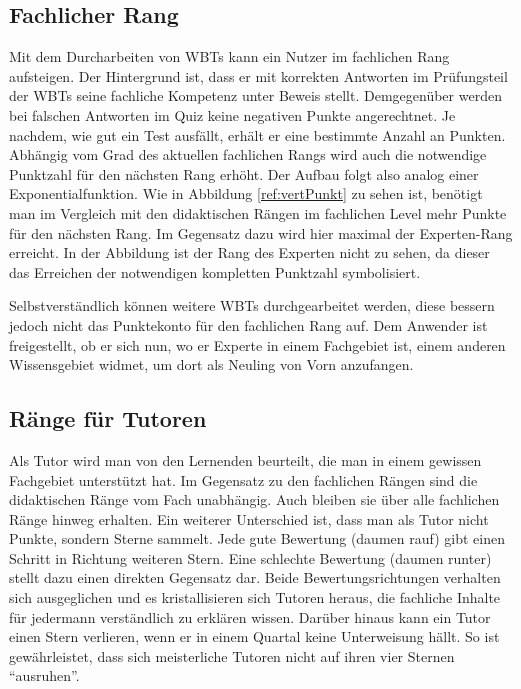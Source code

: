 \subsection{Fachlicher Rang}\label{ref:rankTopic}
Mit dem Durcharbeiten von WBTs kann ein Nutzer im fachlichen Rang aufsteigen.
Der Hintergrund ist, dass er mit korrekten Antworten im Prüfungsteil der WBTs
seine fachliche Kompetenz unter Beweis stellt. Demgegenüber werden bei falschen
Antworten im Quiz keine negativen Punkte angerechtnet. Je nachdem, wie gut ein
Test ausfällt, erhält er eine bestimmte Anzahl an Punkten. Abhängig vom Grad des
aktuellen fachlichen Rangs wird auch die notwendige Punktzahl für den nächsten
Rang erhöht. Der Aufbau folgt also analog einer Exponentialfunktion. Wie in
Abbildung \ref{ref:vertPunkt} zu sehen ist, benötigt man im Vergleich mit den
didaktischen Rängen im fachlichen Level mehr Punkte für den nächsten Rang. Im
Gegensatz dazu wird hier maximal der Experten-Rang erreicht. In der Abbildung
ist der Rang des Experten nicht zu sehen, da dieser das Erreichen der
notwendigen kompletten Punktzahl symbolisiert.

Selbstverständlich können weitere WBTs durchgearbeitet werden, diese bessern
jedoch nicht das Punktekonto für den fachlichen Rang auf. Dem Anwender ist
freigestellt, ob er sich nun, wo er Experte in einem Fachgebiet ist, einem
anderen Wissensgebiet widmet, um dort als Neuling von Vorn anzufangen.

\subsection{Ränge für Tutoren}\label{ref:rankTeach}
Als Tutor wird man von den Lernenden beurteilt, die man in einem gewissen
Fachgebiet unterstützt hat. Im Gegensatz zu den fachlichen Rängen sind die
didaktischen Ränge vom Fach unabhängig. Auch bleiben sie über alle fachlichen
Ränge hinweg erhalten. Ein weiterer Unterschied ist, dass man als Tutor nicht
Punkte, sondern Sterne sammelt. Jede gute Bewertung (daumen rauf) gibt einen
Schritt in Richtung weiteren Stern. Eine schlechte Bewertung (daumen runter)
stellt dazu einen direkten Gegensatz dar. Beide Bewertungsrichtungen verhalten
sich ausgeglichen und es kristallisieren sich Tutoren heraus, die fachliche
Inhalte für jedermann verständlich zu erklären wissen. Darüber hinaus kann ein
Tutor einen Stern verlieren, wenn er in einem Quartal keine Unterweisung
hällt. So ist gewährleistet, dass sich meisterliche Tutoren nicht auf ihren vier
Sternen "`ausruhen"'.

